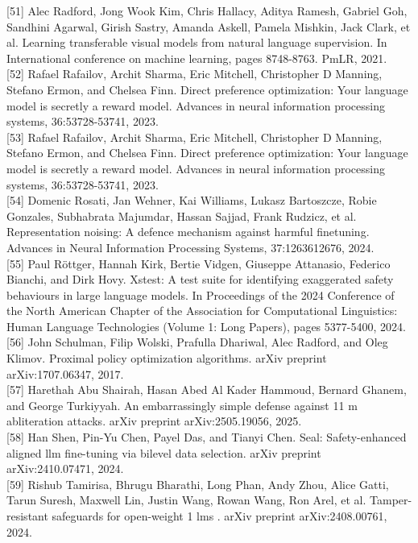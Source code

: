 \documentclass[10pt]{article}
\begin{document}
[51] Alec Radford, Jong Wook Kim, Chris Hallacy, Aditya Ramesh, Gabriel Goh, Sandhini Agarwal, Girish Sastry, Amanda Askell, Pamela Mishkin, Jack Clark, et al. Learning transferable visual models from natural language supervision. In International conference on machine learning, pages 8748-8763. PmLR, 2021.\\[0pt]
[52] Rafael Rafailov, Archit Sharma, Eric Mitchell, Christopher D Manning, Stefano Ermon, and Chelsea Finn. Direct preference optimization: Your language model is secretly a reward model. Advances in neural information processing systems, 36:53728-53741, 2023.\\[0pt]
[53] Rafael Rafailov, Archit Sharma, Eric Mitchell, Christopher D Manning, Stefano Ermon, and Chelsea Finn. Direct preference optimization: Your language model is secretly a reward model. Advances in neural information processing systems, 36:53728-53741, 2023.\\[0pt]
[54] Domenic Rosati, Jan Wehner, Kai Williams, Lukasz Bartoszcze, Robie Gonzales, Subhabrata Majumdar, Hassan Sajjad, Frank Rudzicz, et al. Representation noising: A defence mechanism against harmful finetuning. Advances in Neural Information Processing Systems, 37:1263612676, 2024.\\[0pt]
[55] Paul Röttger, Hannah Kirk, Bertie Vidgen, Giuseppe Attanasio, Federico Bianchi, and Dirk Hovy. Xstest: A test suite for identifying exaggerated safety behaviours in large language models. In Proceedings of the 2024 Conference of the North American Chapter of the Association for Computational Linguistics: Human Language Technologies (Volume 1: Long Papers), pages 5377-5400, 2024.\\[0pt]
[56] John Schulman, Filip Wolski, Prafulla Dhariwal, Alec Radford, and Oleg Klimov. Proximal policy optimization algorithms. arXiv preprint arXiv:1707.06347, 2017.\\[0pt]
[57] Harethah Abu Shairah, Hasan Abed Al Kader Hammoud, Bernard Ghanem, and George Turkiyyah. An embarrassingly simple defense against 11 m abliteration attacks. arXiv preprint arXiv:2505.19056, 2025.\\[0pt]
[58] Han Shen, Pin-Yu Chen, Payel Das, and Tianyi Chen. Seal: Safety-enhanced aligned llm fine-tuning via bilevel data selection. arXiv preprint arXiv:2410.07471, 2024.\\[0pt]
[59] Rishub Tamirisa, Bhrugu Bharathi, Long Phan, Andy Zhou, Alice Gatti, Tarun Suresh, Maxwell Lin, Justin Wang, Rowan Wang, Ron Arel, et al. Tamper-resistant safeguards for open-weight 1 lms . arXiv preprint arXiv:2408.00761, 2024.\\[0pt]
\end{document}
